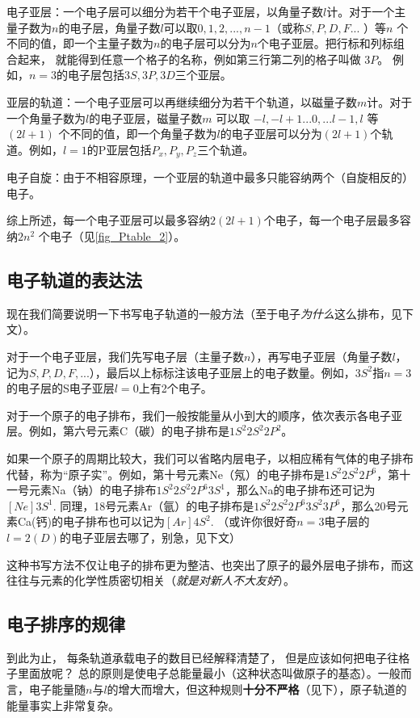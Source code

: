 电子亚层：一个电子层可以细分为若干个电子亚层，以角量子数$l$计。对于一个主量子数为$n$的电子层，角量子数$l$可以取$0,1,2,...,n-1$（或称$S,P,D,F...$ ）等$n$ 个不同的值，即一个主量子数为$n$的电子层可以分为$n$个电子亚层。把行标和列标组合起来， 就能得到任意一个格子的名称，例如第三行第二列的格子叫做 $3P$。 例如，$n=3$的电子层包括$3S, 3P, 3D$三个亚层。

亚层的轨道：一个电子亚层可以再继续细分为若干个轨道，以磁量子数$m$计。对于一个角量子数为$l$的电子亚层，磁量子数$m$ 可以取 $ - l, - l + 1...0,...l - 1,l$ 等 $(2l + 1)$ 个不同的值，即一个角量子数为$l$的电子亚层可以分为$(2l+1)$个轨道。例如，$l=1$的P亚层包括$P_x, P_y, P_z$三个轨道。

电子自旋：由于不相容原理，一个亚层的轨道中最多只能容纳两个（自旋相反的）电子。

综上所述，每一个电子亚层可以最多容纳$2(2l+1)$个电子，每一个电子层最多容纳$2n^2$ 个电子（见\autoref{fig_Ptable_2}）。%
\subsection{电子轨道的表达法}
现在我们简要说明一下书写电子轨道的一般方法（至于电子\textsl{为什么}这么排布，见下文）。

对于一个电子亚层，我们先写电子层（主量子数$n$），再写电子亚层（角量子数$l$，记为$S, P,D,F,...$），最后以上标标注该电子亚层上的电子数量。例如，$3S^2$指$n=3$的电子层的S电子亚层$l=0$上有2个电子。

对于一个原子的电子排布，我们一般按能量从小到大的顺序，依次表示各电子亚层。例如，第六号元素C（碳）的电子排布是$1S^2 2S^2 2P^2$。

如果一个原子的周期比较大，我们可以省略内层电子，以相应稀有气体的电子排布代替，称为“原子实”。例如，第十号元素Ne（氖）的电子排布是$1S^2 2S^2 2P^6$，第十一号元素Na（钠）的电子排布$1S^2 2S^2 2P^6 3S^1$，那么Na的电子排布还可记为$[Ne] 3S^1$. 同理，18号元素Ar（氩）的电子排布是$1S^2 2S^2 2P^6 3S^2 3P^6$，那么20号元素Ca(钙)的电子排布也可以记为$[Ar] 4S^2$. （或许你很好奇$n=3$电子层的$l=2 (D)$的电子亚层去哪了，别急，见下文）

这种书写方法不仅让电子的排布更为整洁、也突出了原子的最外层电子排布，而这往往与元素的化学性质密切相关（\textsl{就是对新人不大友好}）。

\subsection{电子排序的规律}
到此为止， 每条轨道承载电子的数目已经解释清楚了， 但是应该如何把电子往格子里面放呢？ 总的原则是使电子总能量最小（这种状态叫做原子的基态）。一般而言，电子能量随$n$与$l$的增大而增大，但这种规则\textbf{十分不严格}（见下），原子轨道的能量事实上非常复杂。

